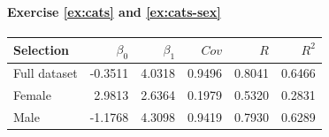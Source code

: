 \paragraph{Exercise \ref{ex:cats} and \ref{ex:cats-sex}}

\begin{center}
  \begin{tabular}{lrrrrr}
  	\toprule
    \textbf{Selection} & \textbf{$\beta_{0}$} & \textbf{$\beta_{1}$} & \textbf{$Cov$} & \textbf{$R$} & \textbf{$R^2$} \\
    \midrule
  	Full dataset & -0.3511 & 4.0318 & 0.9496 & 0.8041 & 0.6466 \\
  	Female       &  2.9813 & 2.6364 & 0.1979 & 0.5320 & 0.2831 \\
  	Male         & -1.1768 & 4.3098 & 0.9419 & 0.7930 & 0.6289 \\
    \bottomrule
  \end{tabular}
\end{center}

